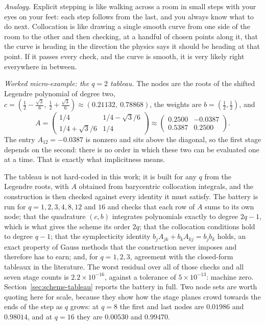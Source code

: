 \documentclass[11pt,a4paper]{article}
\begin{document}
\emph{Analogy.} Explicit stepping is like walking across a room in small steps
with your eyes on your feet: each step follows from the last, and you always
know what to do next. Collocation is like drawing a single smooth curve from
one side of the room to the other and then checking, at a handful of chosen
points along it, that the curve is heading in the direction the physics says it
should be heading at that point. If it passes every check, and the curve is
smooth, it is very likely right everywhere in between.

\emph{Worked micro-example: the $q = 2$ tableau.} The nodes are the roots of
the shifted Legendre polynomial of degree two,
$c = \left(\tfrac12 - \tfrac{\sqrt3}{6},\ \tfrac12 + \tfrac{\sqrt3}{6}\right)
 \approx (0.21132,\ 0.78868)$, the weights are $b = (\tfrac12, \tfrac12)$, and
%
\begin{equation}
  A = \begin{pmatrix}
        1/4 & 1/4 - \sqrt3/6 \\[2pt]
        1/4 + \sqrt3/6 & 1/4
      \end{pmatrix}
    \approx \begin{pmatrix}
        0.2500 & -0.0387 \\[2pt]
        0.5387 & 0.2500
      \end{pmatrix}.
  \label{eq:tableau2}
\end{equation}
%
The entry $A_{12} = -0.0387$ is nonzero and sits above the diagonal, so the
first stage depends on the second: there is no order in which these two can be
evaluated one at a time. That is exactly what implicitness means.

The tableau is not hard-coded in this work; it is built for any $q$ from the
Legendre roots, with $A$ obtained from barycentric collocation integrals, and
the construction is then checked against every identity it must satisfy. The
battery is run for $q = 1, 2, 3, 4, 8, 12$ and $16$ and checks that each row of
$A$ sums to its own node; that the quadrature $(c, b)$ integrates polynomials
exactly to degree $2q - 1$, which is what gives the scheme its order $2q$; that
the collocation conditions hold to degree $q - 1$; that the symplecticity
identity $b_j A_{jk} + b_k A_{kj} = b_j b_k$ holds, an exact property of Gauss
methods that the construction never imposes and therefore has to earn; and, for
$q = 1, 2, 3$, agreement with the closed-form tableaux in the literature. The
worst residual over all of those checks and all seven stage counts is
$2.2\times10^{-16}$, against a tolerance of $5\times10^{-13}$: machine zero.
Section~\ref{sec:scheme-tableau} reports the battery in full. Two node sets are
worth quoting here for scale, because they show how the stage planes crowd
towards the ends of the step as $q$ grows: at $q = 8$ the first and last nodes
are $0.01986$ and $0.98014$, and at $q = 16$ they are $0.00530$ and $0.99470$.
\end{document}
